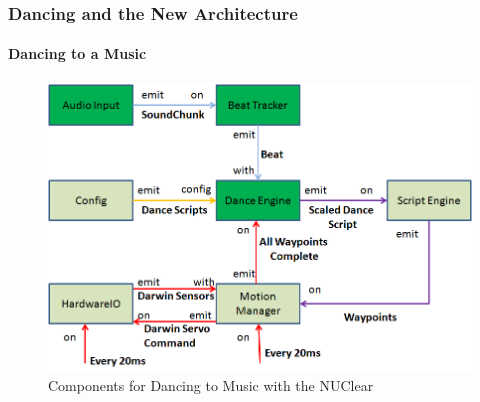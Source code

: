 \documentclass{beamer}
\begin{document}
	\begin{frame}
		\frametitle{Dancing and the New Architecture}
		\framesubtitle{Dancing to a Music}
		\begin{figure}
			\centering
			\includegraphics[scale=.45]{Presentation_Images/dance_audio_new_arc_change.png}
			\caption{Components for Dancing to Music with the NUClear}
		\end{figure}
	\end{frame}	
\end{document}
